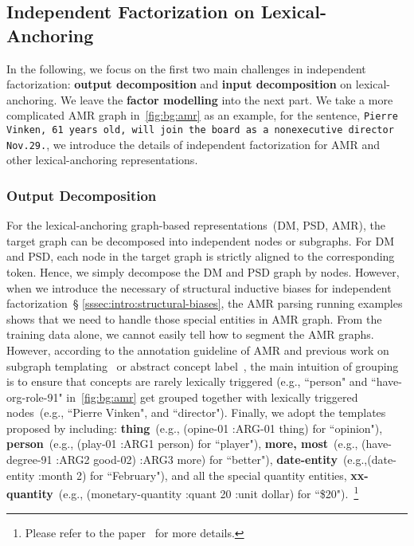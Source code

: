 \subsection{Independent Factorization on Lexical-Anchoring}
\label{ssec:lex-phr:lex-factorization-analysis}
In the following, we focus on the first two main challenges in
independent factorization: \textbf{output decomposition} and
\textbf{input decomposition} on lexical-anchoring. We leave the
\textbf{factor modelling} into the next part.  We take a more
complicated AMR graph in~\autoref{fig:bg:amr} as an example, for the
sentence, \texttt{Pierre Vinken, 61 years old, will join the board as
  a nonexecutive director Nov.29.}, we introduce the details of
independent factorization for AMR and other lexical-anchoring
representations.


\subsubsection{Output Decomposition}
\label{sssec:lex-phr:lex-output-decomposition}
For the lexical-anchoring graph-based representations~(DM, PSD, AMR),
the target graph can be decomposed into independent nodes or
subgraphs. For DM and PSD, each node in the target graph is strictly
aligned to the corresponding token. Hence, we simply decompose the DM
and PSD graph by nodes. However, when we introduce the necessary of
structural inductive biases for independent factorization~\S
\ref{sssec:intro:structural-biases}, the AMR parsing running examples
shows that we need to handle those special entities in AMR graph.
From the training data alone, we cannot easily tell how to segment the
AMR graphs. However, according to the annotation guideline of AMR and
previous work on subgraph templating~\cite{Werling:2015up} or abstract
concept label~\cite{Wang:2017vt}, the main intuition of grouping is to
ensure that concepts are rarely lexically triggered (e.g., ``person"
and ``have-org-role-91" in~\autoref{fig:bg:amr} get grouped together
with lexically triggered nodes~(e.g., ``Pierre Vinken", and
``director"). Finally, we adopt the templates proposed by
\citet{corro2019learning} including: \textbf{thing}~(e.g., (opine-01
:ARG-01 thing) for ``opinion"), \textbf{person}~(e.g., (play-01 :ARG1
person) for ``player"), \textbf{more, most}~(e.g., (have-degree-91
:ARG2 good-02) :ARG3 more) for ``better"),
\textbf{date-entity}~(e.g.,(date-entity :month 2) for ``February"),
and all the special quantity entities, \textbf{xx-quantity}~(e.g.,
(monetary-quantity :quant 20 :unit dollar) for
``\$20").~\footnote{Please refer to the paper~\cite{lyu2018amr} for
  more details.}

